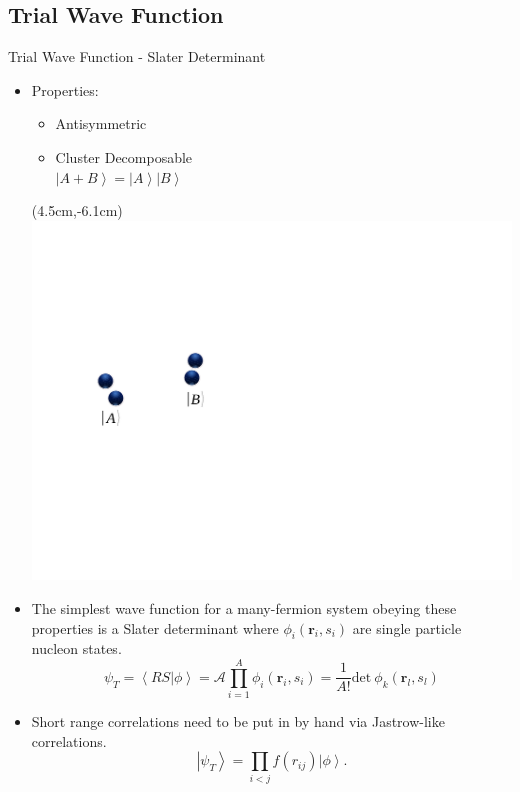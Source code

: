 \documentclass{beamer}
\newcommand{\ket}[1]{\left| #1 \right>}
\newcommand{\braket}[2]{\left< #1 | #2 \right>}
\begin{document}

\subsection{Trial Wave Function}
\begin{frame}{Trial Wave Function - Slater Determinant}
\begin{itemize}
   \item Properties:
   \begin{itemize}
      \item Antisymmetric
      \item Cluster Decomposable \\ $\ket{A+B} = \ket{A}\ket{B}$
   \end{itemize}
   \begin{textblock*}{\textwidth}(4.5cm,-6.1cm) %
      \includegraphics[width=14.6cm]{../figures/cluster.pdf}
   \end{textblock*}
   \item The simplest wave function for a many-fermion system obeying these properties is a Slater determinant where $\phi_i(\mathbf{r}_i,s_i)$ are single particle nucleon states.
   \begin{equation*}
      \psi_{T} = \braket{RS}{\phi}= \mathcal{A} \prod\limits_{i=1}^A \phi_i(\mathbf{r}_i,s_i) = \frac{1}{A!} \mathrm{det}~\phi_k(\mathbf{r}_l,s_l)
   \end{equation*}
   \item Short range correlations need to be put in by hand via Jastrow-like correlations.
   \begin{equation*}
      \ket{\psi_T} = \prod\limits_{i<j}f(r_{ij}) \ket{\phi}.
   \end{equation*}
\end{itemize}
\end{frame}
\end{document}
